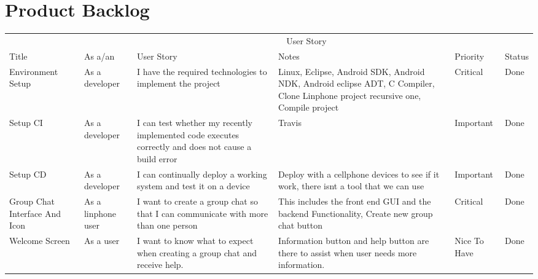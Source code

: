\documentclass[a4paper]{article}
\begin{document}
\section{Product Backlog}
\begin{table}[H]
\begin{tabular}{p{1.5cm} p{2.5cm} p{3cm} p{3cm} p{1cm} p{1cm}} %
\hline %
& \multicolumn{5}{c}{User Story} \\ %
\cmidrule(l){2-6} %
Title & As a/an & User Story & Notes & Priority & Status\\ %
\hline %
Environment Setup & As a developer & I have the required technologies to implement the project & Linux, Eclipse, Android SDK, Android NDK, Android eclipse ADT, C Compiler, Clone Linphone project recursive one, Compile project  & Critical & Done\\ \cmidrule(l){2-6} %
Setup CI & As a developer & I can test whether my recently implemented code executes correctly and does not cause a build error & Travis & Important & Done\\ \cmidrule(l){2-6}%

Setup CD & As a developer & I can continually deploy a working system and test it on a device & Deploy with a cellphone devices to see if it work, there isnt a tool that we can use & Important & Done\\ \cmidrule(l){2-6} %

Group Chat Interface And Icon & As a linphone user & I want to create a group chat so that I can communicate with more than one person  & This includes the front end GUI and the backend Functionality, Create new group chat button & Critical & Done\\ \cmidrule(l){2-6}%


Welcome Screen & As a user & I want to know what to expect when creating a group chat and receive help. & Information button and help button are there to assist when user needs more information. & Nice To Have & Done\\  \cmidrule(l){2-6}%


\end{tabular}
\end{table}
\end{document}

